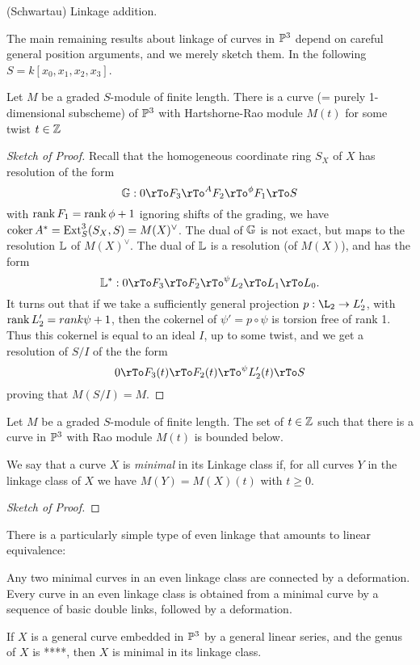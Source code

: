 \begin{exercise} (Schwartau) Linkage addition.
 
\end{exercise}

The main remaining results about linkage of curves in ${\mathbb P}^3$ depend on careful general position arguments, and we merely
sketch them. In the following $S = k[x_0,x_1,x_2,x_3]$.

\begin{theorem}
Let $M$ be a graded $S$-module of finite length. There is a curve (= purely 1-dimensional subscheme) of ${\mathbb P}^3$ with Hartshorne-Rao module $M(t)$ for some twist $t\in {\mathbb Z}$
\end{theorem}
\begin{proof}[Sketch of Proof] 
Recall that the homogeneous coordinate
ring $S_X$ of $X$ has resolution of the form
$$
\GG: 0\rTo F_3\rTo^A F_2\rTo^\phi F_1\rTo S
$$
with $\operatorname{rank} F_1 = \operatorname{rank} \phi+1$
ignoring shifts of the grading, we have ${\rm{coker}\,} A^* = {\rm{Ext}}^3_S(S_X,S)  = M(X)^\vee$. The dual of ${\mathbb G}$ is not exact, but maps to the 
resolution ${\mathbb L}$ of $M(X)^\vee$. The dual of ${\mathbb L}$ is a resolution (of $M(X)$), and has the form
$$
\LL^*: 0\rTo F_3 \rTo F_2\rTo^\psi L_2\rTo L_1\rTo L_0.
$$
It turns out that if we take a sufficiently general projection $p: \L_2\to L_2'$, with $\operatorname{rank} L_2' = rank \psi+1$, then
the cokernel of $\psi' = p\circ \psi$ is torsion free of rank 1. Thus this cokernel is equal to an ideal $I$, up to some twist, 
and we get a resolution of $S/I$ of the the form
$$
0\rTo F_3(t) \rTo F_2(t) \rTo^\psi L_2'(t)\rTo S
$$
proving that $M(S/I) = M$.
\end{proof}

\begin{theorem}
Let $M$ be a graded $S$-module of finite length. The set of $t\in{\mathbb Z}$ such that there is a curve in ${\mathbb P}^3$ with Rao module
$M(t)$ is bounded below. 
\end{theorem}
We say that a curve $X$ is \emph{minimal} in its Linkage class if, for all curves $Y$ in the linkage class of $X$ we have
$M(Y) = M(X)(t)$ with $t\geq 0$.
\begin{proof}[Sketch of Proof] 
\end{proof}

There is a particularly simple type of even linkage that amounts to linear equivalence: 
\begin{theorem}\label{Lazarsfeld-Rao}
Any two minimal curves in an even linkage class are connected by a deformation.
Every curve in an even linkage class is obtained from a minimal curve by a sequence of basic double links, followed by a deformation.
\end{theorem}

\begin{theorem}
If $X$ is a general curve embedded in ${\mathbb P}^3$ by a general linear series, and the genus of $X$ is ****, then $X$ is minimal in its linkage class.
\end{theorem}

